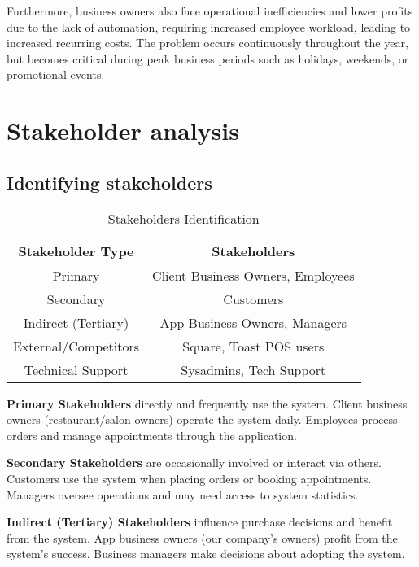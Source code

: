 \documentclass[]{VUMIFTemplateClass}
\begin{document}
Furthermore, business owners also face operational inefficiencies and lower
profits due to the lack of automation, requiring increased employee workload,
leading to increased recurring costs. The problem occurs continuously throughout
the year, but becomes critical during peak business periods such as holidays,
weekends, or promotional events.

\section{Stakeholder analysis}

\subsection{Identifying stakeholders}



\begin{table}[h]
  \centering
  \begin{tabular}{|c|c|}
    \hline
    Stakeholder Type    & Stakeholders \\ \hline
    Primary             & Client Business Owners, Employees \\ \hline
    Secondary           & Customers \\ \hline
    Indirect (Tertiary) & App Business Owners, Managers \\ \hline
    External/Competitors & Square, Toast POS users \\ \hline
    Technical Support   & Sysadmins, Tech Support \\ \hline
  \end{tabular}
  \caption{Stakeholders Identification}
  \label{tab:stakeholders}
\end{table}

\textbf{Primary Stakeholders} directly and frequently use the system. Client
business owners (restaurant/salon owners) operate the system daily. Employees
process orders and manage appointments through the application.

\textbf{Secondary Stakeholders} are occasionally involved or interact via
others. Customers use the system when placing orders or booking appointments.
Managers oversee operations and may need access to system statistics.

\textbf{Indirect (Tertiary) Stakeholders} influence purchase decisions and
benefit from the system. App business owners (our company's owners) profit from
the system's success. Business managers make decisions about adopting the
system.
\end{document}
